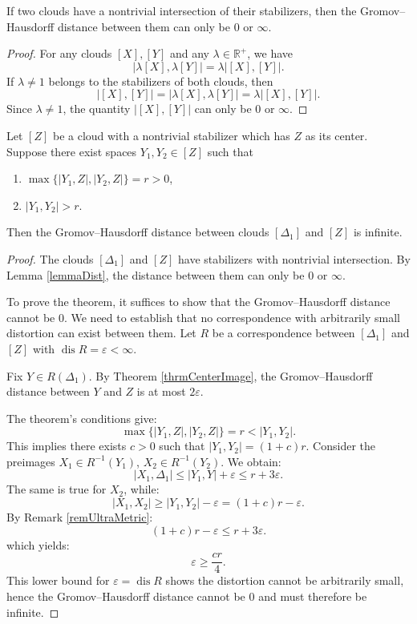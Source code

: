\documentclass[leqno]{article}
\begin{document}
\begin{lemma}\label{lemmaDist}
  If two clouds have a nontrivial intersection of their stabilizers,
  then the Gromov--Hausdorff distance between them can only be $0$ or $\infty$.
\end{lemma}

\begin{proof}
  For any clouds $[X], [Y]$ and any $\lambda \in \mathbb{R}^{+}$, we have
  $$
  \big|\lambda[X], \lambda[Y]\big| = \lambda\big|[X], [Y]\big|.
  $$
  If $\lambda \neq 1$ belongs to the stabilizers of both clouds, then
  $$
  \big|[X],[Y]\big| = \big|\lambda[X], \lambda[Y]\big| =
  \lambda\big|[X], [Y]\big|.
  $$
  Since $\lambda \neq 1$, the quantity $\big|[X],[Y]\big|$ can only
  be $0$ or $\infty$.
\end{proof}

\begin{theorem}\label{thrmDist}
  Let $[Z]$ be a cloud with a nontrivial stabilizer which has $Z$ as
  its center. Suppose there exist spaces $Y_{1}, Y_{2} \in [Z]$ such that
  \begin{enumerate}
    \item $\max\{ |Y_{1},Z|, |Y_{2}, Z| \} = r > 0$,
    \item $|Y_{1}, Y_{2}| > r$.
  \end{enumerate}
  Then the Gromov--Hausdorff distance between clouds $[\Delta_1]$ and
  $[Z]$ is infinite.
\end{theorem}

\begin{proof}
  The clouds $[\Delta_1]$ and $[Z]$ have stabilizers with nontrivial
  intersection. By Lemma \ref{lemmaDist}, the distance between them
  can only be $0$ or $\infty$.

  To prove the theorem, it suffices to show that the
  Gromov--Hausdorff distance cannot be $0$. We need to establish that
  no correspondence with arbitrarily small distortion can exist
  between them. Let $R$ be a correspondence between $[\Delta_1]$ and
  $[Z]$ with $\operatorname{dis} R = \varepsilon < \infty$.

  Fix $Y \in R(\Delta_1)$. By Theorem \ref{thrmCenterImage}, the
  Gromov--Hausdorff distance between $Y$ and $Z$ is at most $2\varepsilon$.

  The theorem's conditions give:
  $$
  \max\{ |Y_{1},Z|, |Y_{2}, Z| \} = r < |Y_{1}, Y_{2}|.
  $$
  This implies there exists $c > 0$ such that $|Y_{1},Y_{2}| = (1 +
  c)r$. Consider the preimages $X_1 \in R^{-1}(Y_{1})$, $X_2 \in
  R^{-1}(Y_{2})$. We obtain:
  $$
  |X_1, \Delta_1| \leq |Y_{1}, Y| + \varepsilon \leq r + 3\varepsilon.
  $$
  The same is true for $X_2$, while:
  $$
  |X_1, X_2| \geq |Y_{1}, Y_{2}| - \varepsilon = (1+c)r - \varepsilon.
  $$
  By Remark \ref{remUltraMetric}:
  $$
  (1+c)r - \varepsilon \leq r + 3\varepsilon.
  $$
  which yields:
  $$
  \varepsilon \geq \frac{cr}{4}.
  $$
  This lower bound for $\varepsilon = \operatorname{dis} R$ shows the
  distortion cannot be arbitrarily small, hence the Gromov--Hausdorff
  distance cannot be $0$ and must therefore be infinite.
\end{proof}
\end{document}
